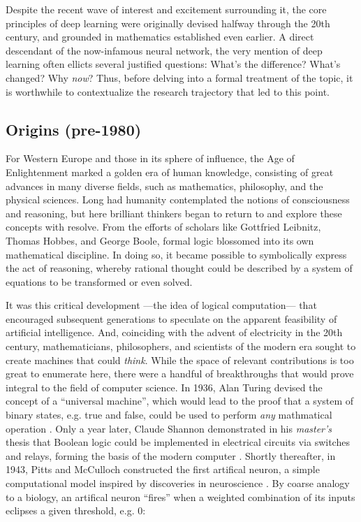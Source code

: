 Despite the recent wave of interest and excitement surrounding it, the core principles of deep learning were originally devised halfway through the 20th century, and grounded in mathematics established even earlier.
A direct descendant of the now-infamous neural network, the very mention of deep learning often ellicts several justified questions: What's the difference? What's changed? Why \emph{now}?
Thus, before delving into a formal treatment of the topic, it is worthwhile to contextualize the research trajectory that led to this point.


\subsection{Origins (pre-1980)}
\label{subsec:origins}

For Western Europe and those in its sphere of influence, the Age of Enlightenment marked a golden era of human knowledge, consisting of great advances in many diverse fields, such as mathematics, philosophy, and the physical sciences.
Long had humanity contemplated the notions of consciousness and reasoning, but here brilliant thinkers began to return to and explore these concepts with resolve.
From the efforts of scholars like Gottfried Leibnitz, Thomas Hobbes, and George Boole, formal logic blossomed into its own mathematical discipline.
In doing so, it became possible to symbolically express the act of reasoning, whereby rational thought could be described by a system of equations to be transformed or even solved.

It was this critical development ---the idea of logical computation--- that encouraged subsequent generations to speculate on the apparent feasibility of artificial intelligence.
And, coinciding with the advent of electricity in the 20th century, mathematicians, philosophers, and scientists of the modern era sought to create machines that could \emph{think}.
While the space of relevant contributions is too great to enumerate here, there were a handful of breakthroughs that would prove integral to the field of computer science.
In 1936, Alan Turing devised the concept of a ``universal machine'', which would lead to the proof that a system of binary states, e.g. true and false, could be used to perform \emph{any} mathmatical operation \cite{Turing1936}.
Only a year later, Claude Shannon demonstrated in his \emph{master's} thesis that Boolean logic could be implemented in electrical circuits via switches and relays, forming the basis of the modern computer \cite{Shannon1937}.
Shortly thereafter, in 1943, Pitts and McCulloch constructed the first artifical neuron, a simple computational model inspired by discoveries in neuroscience \cite{Pitts1943}.
By coarse analogy to a biology, an artifical neuron ``fires'' when a weighted combination of its inputs eclipses a given threshold, e.g. 0:

